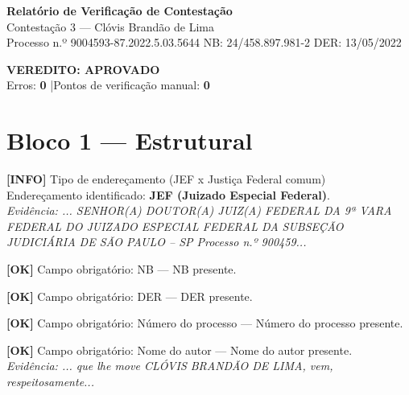 \documentclass[12pt,a4paper]{article}
\newcommand{\statusOK}[1]{\textcolor{corOK}{\textbf{[OK]}} #1}
\newcommand{\statusINFO}[1]{\textcolor{corINFO}{\textbf{[INFO]}} #1}
\begin{document}
\begin{center}
  {\LARGE \textbf{Relatório de Verificação de Contestação}}\\[0.4em]
  {\large Contestação 3 --- Clóvis Brandão de Lima}\\[0.2em]
  {\small Processo n.º 9004593-87.2022.5.03.5644 \quad NB: 24/458.897.981-2 \quad DER: 13/05/2022}
\end{center}

\vspace{0.5em}
\noindent\colorbox{corFundoAprovado}{%
  \begin{minipage}{\dimexpr\linewidth-2\fboxsep}
    \centering
    \vspace{0.3em}
    {\large \textcolor{corOK}{\textbf{VEREDITO: APROVADO}}}\\
    Erros: \textbf{0} \quad|\quad Pontos de verificação manual: \textbf{0}
    \vspace{0.3em}
  \end{minipage}%
}

\vspace{1em}

\section{Bloco 1 --- Estrutural}

\statusINFO{Tipo de endereçamento (JEF x Justiça Federal comum)}\\
Endereçamento identificado: \textbf{JEF (Juizado Especial Federal)}.\\
\textit{Evidência: ... SENHOR(A) DOUTOR(A) JUIZ(A) FEDERAL DA 9ª VARA FEDERAL DO JUIZADO ESPECIAL FEDERAL DA SUBSEÇÃO JUDICIÁRIA DE SÃO PAULO -- SP Processo n.º 900459...}

\medskip
\statusOK{Campo obrigatório: NB} --- NB presente.

\medskip
\statusOK{Campo obrigatório: DER} --- DER presente.

\medskip
\statusOK{Campo obrigatório: Número do processo} --- Número do processo presente.

\medskip
\statusOK{Campo obrigatório: Nome do autor} --- Nome do autor presente.\\
\textit{Evidência: ... que lhe move CLÓVIS BRANDÃO DE LIMA, vem, respeitosamente...}
\end{document}
